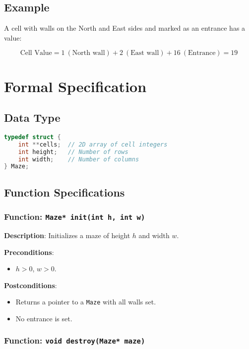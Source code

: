 \documentclass{article}
\begin{document}
\subsection*{Example}

A cell with walls on the North and East sides and marked as an entrance has a value:

\[
\text{Cell Value} = 1 \ (\text{North wall}) + 2 \ (\text{East wall}) + 16 \ (\text{Entrance}) = 19
\]

\section*{Formal Specification}

\subsection*{Data Type}

\begin{lstlisting}[language=C]
typedef struct {
    int **cells;  // 2D array of cell integers
    int height;   // Number of rows
    int width;    // Number of columns
} Maze;
\end{lstlisting}

\subsection*{Function Specifications}

\subsubsection*{Function: \texttt{Maze* init(int h, int w)}}

\textbf{Description}: Initializes a maze of height $h$ and width $w$.

\textbf{Preconditions}:
\begin{itemize}[noitemsep]
    \item $h > 0$, $w > 0$.
\end{itemize}

\textbf{Postconditions}:
\begin{itemize}[noitemsep]
    \item Returns a pointer to a \texttt{Maze} with all walls set.
    \item No entrance is set.
\end{itemize}

\subsubsection*{Function: \texttt{void destroy(Maze* maze)}}
\end{document}
